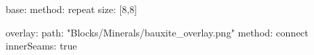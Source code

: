 base:
  method: repeat
  size: [8,8]

overlay:
  path: "Blocks/Minerals/bauxite_overlay.png"
  method: connect
  innerSeams: true